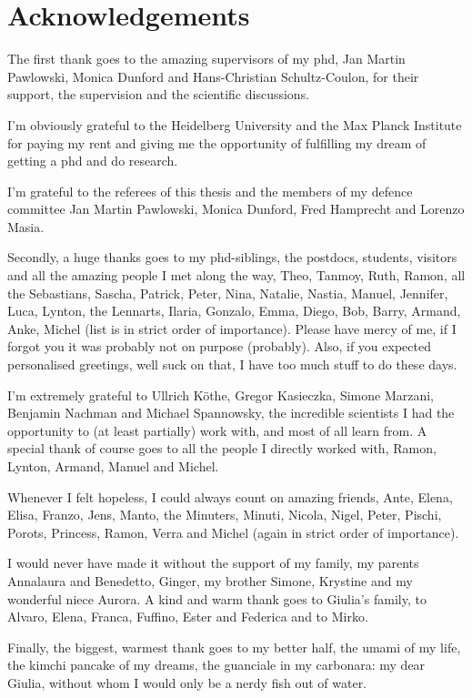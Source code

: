 \chapter{Acknowledgements}\label{chap:acknowledgements}
\enlargethispage{2ex}
\vspace*{-2pt}
\thispagestyle{empty}

The first thank goes to the amazing supervisors of my phd,  Jan Martin Pawlowski, Monica Dunford and Hans-Christian Schultz-Coulon, for their support, the supervision and the scientific discussions.

\medskip

I'm obviously grateful to the Heidelberg University and the Max Planck Institute for paying my rent and giving me the opportunity of fulfilling my dream of getting a phd and do research.

\medskip

I'm grateful to the referees of this thesis and the members of my defence committee Jan Martin Pawlowski, Monica Dunford, Fred Hamprecht and Lorenzo Masia.

\medskip

Secondly, a huge thanks goes to my phd-siblings, the postdocs, students, visitors and all the amazing people I met along the way, Theo, Tanmoy, Ruth, Ramon, all the Sebastians, Sascha, Patrick, Peter, Nina, Natalie, Nastia, Manuel, Jennifer, Luca, Lynton, the Lennarts, Ilaria, Gonzalo, Emma, Diego, Bob, Barry, Armand, Anke, Michel (list is in strict order of importance). Please have mercy of me, if I forgot you it was probably not on purpose (probably). Also, if you expected personalised greetings, well suck on that, I have too much stuff to do these days.

\medskip

I'm extremely grateful to Ullrich Köthe, Gregor Kasieczka, Simone Marzani, Benjamin Nachman and Michael Spannowsky, the incredible scientists I had the opportunity to (at least partially) work with, and most of all learn from. A special thank of course goes to all the people I directly worked with, Ramon, Lynton, Armand, Manuel and Michel.


\medskip

Whenever I felt hopeless, I could always count on amazing friends, Ante, Elena, Elisa, Franzo, Jens, Manto, the Minuters, Minuti, Nicola, Nigel, Peter, Pischi, Porots, Princess, Ramon, Verra and Michel (again in strict order of importance).

\medskip

I would never have made it without the support of my family, my parents Annalaura and Benedetto, Ginger, my brother Simone, Krystine and my wonderful niece Aurora. A kind and warm thank goes to Giulia's family, to Alvaro, Elena, Franca, Fuffino, Ester and Federica and to Mirko.

\medskip

Finally, the biggest, warmest thank goes to my better half, the umami of my life, the kimchi pancake of my dreams, the guanciale in my carbonara: my dear Giulia, without whom I would only be a nerdy fish out of water.

